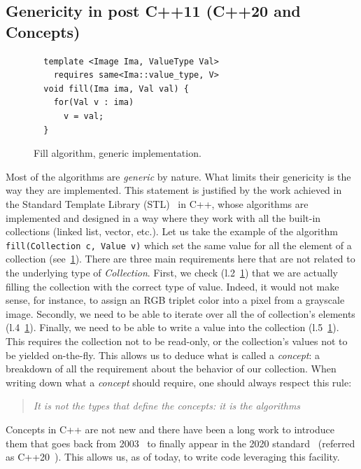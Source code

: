 \subsection{Genericity in post C++11 (C++20 and Concepts)}
\label{sec:postcpp11}

\begin{figure}[htbp]
  \centering
  \begin{verbatim}
  template <Image Ima, ValueType Val>
    requires same<Ima::value_type, V>
  void fill(Ima ima, Val val) {
    for(Val v : ima)
      v = val;
  }
  \end{verbatim}
  
  \caption{Fill algorithm, generic implementation.}
  \label{code:gen.fill}
\end{figure}

Most of the algorithms are \emph{generic} by nature. What limits their genericity is the way they are implemented. This
statement is justified by the work achieved in the Standard Template Library (STL)~\parencite{dehnert.1998.fundamentals}
in C++, whose algorithms are implemented and designed in a way where they work with all the built-in collections (linked
list, vector, etc.). Let us take the example of the algorithm \texttt{fill(Collection c, Value v)} which set the same
value for all the element of a collection (see~\cref{code:gen.fill}). There are three main requirements here that are
not related to the underlying type of \emph{Collection}. First, we check (l.2~\cref{code:gen.fill}) that we are actually
filling the collection with the correct type of value. Indeed, it would not make sense, for instance, to assign an RGB
triplet color into a pixel from a grayscale image. Secondly, we need to be able to iterate over all the of collection's
elements (l.4~\cref{code:gen.fill}). Finally, we need to be able to write a value into the collection
(l.5~\cref{code:gen.fill}). This requires the collection not to be read-only, or the collection's values not to be
yielded on-the-fly. This allows us to deduce what is called a \emph{concept}: a breakdown of all the requirement about
the behavior of our collection. When writing down what a \emph{concept} should require, one should always respect this
rule: \blockquote{\emph{It is not the types that define the concepts: it is the algorithms}}. Concepts in C++ are not
new and there have been a long work to introduce them that goes back from
2003~\parencite{seymour.2009.concepts,stroustrup.2003.concepts,sutton.2017.concepts} to finally appear in the 2020
standard~\parencite{voutilainen.2017.concepts} (referred as C++20~\parencite{iso.2011.cpp}). This allows us, as of
today, to write code leveraging this facility.

